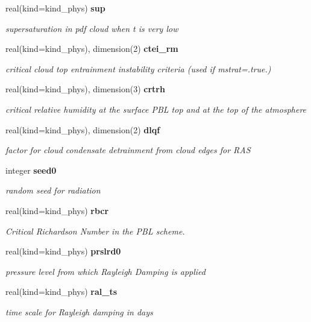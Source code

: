 \begin{DoxyCompactItemize}
real(kind=kind\+\_\+phys) \textbf{ sup}
\begin{DoxyCompactList}\small\item\em supersaturation in pdf cloud when t is very low \end{DoxyCompactList}\item 
real(kind=kind\+\_\+phys), dimension(2) \textbf{ ctei\+\_\+rm}
\begin{DoxyCompactList}\small\item\em critical cloud top entrainment instability criteria (used if mstrat=.true.) \end{DoxyCompactList}\item 
real(kind=kind\+\_\+phys), dimension(3) \textbf{ crtrh}
\begin{DoxyCompactList}\small\item\em critical relative humidity at the surface P\+BL top and at the top of the atmosphere \end{DoxyCompactList}\item 
real(kind=kind\+\_\+phys), dimension(2) \textbf{ dlqf}
\begin{DoxyCompactList}\small\item\em factor for cloud condensate detrainment from cloud edges for R\+AS \end{DoxyCompactList}\item 
integer \textbf{ seed0}
\begin{DoxyCompactList}\small\item\em random seed for radiation \end{DoxyCompactList}\item 
real(kind=kind\+\_\+phys) \textbf{ rbcr}
\begin{DoxyCompactList}\small\item\em Critical Richardson Number in the P\+BL scheme. \end{DoxyCompactList}\item 
real(kind=kind\+\_\+phys) \textbf{ prslrd0}
\begin{DoxyCompactList}\small\item\em pressure level from which Rayleigh Damping is applied \end{DoxyCompactList}\item 
real(kind=kind\+\_\+phys) \textbf{ ral\+\_\+ts}
\begin{DoxyCompactList}\small\item\em time scale for Rayleigh damping in days \end{DoxyCompactList}\item 

\end{DoxyCompactItemize}
